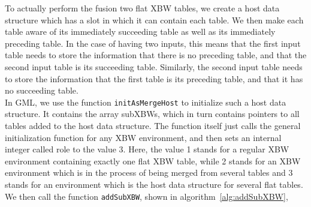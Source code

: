 \documentclass[a4paper,12pt,twoside,BCOR=10mm]{scrbook}
\begin{document}
To actually perform the fusion two flat XBW tables, we create
a host data structure which has a slot in which it can contain each table.
We then make each table aware of its immediately succeeding table as well as its immediately preceding table.
In the case of having two inputs, this means that the first input table needs to store the information
that there is no preceding table, and that the second input table is its succeeding table.
Similarly, the second input table needs to store the information that the first table is
its preceding table, and that it has no succeeding table. \\
In GML, we use the function \texttt{initAsMergeHost} to initialize such a host data structure.
It contains the array subXBWs, which in turn contains pointers to all tables added to the host data structure.
The function itself just calls the general initialization function for any XBW environment,
and then sets an internal integer called role to the value 3.
Here, the value 1 stands for a regular XBW environment containing exactly one flat XBW table,
while 2 stands for an XBW environment which is in the process of being merged from several tables
and 3 stands for an environment which is the host data structure for several flat tables. \\
We then call the function \texttt{addSubXBW}, shown in algorithm~\ref{alg:addSubXBW},
\end{document}

